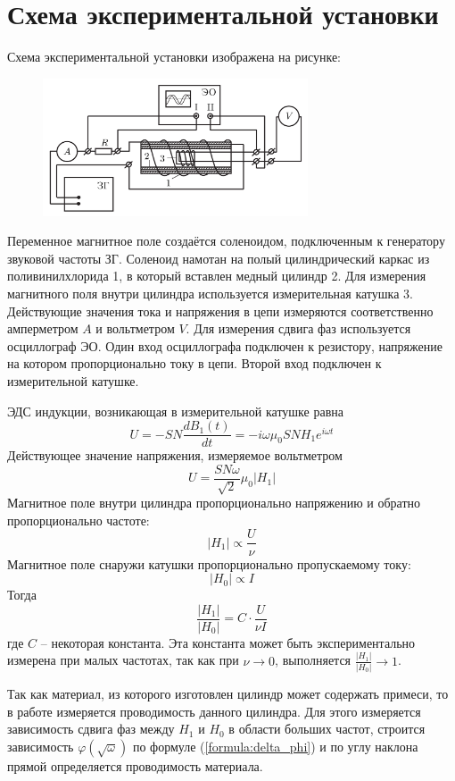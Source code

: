 \section*{Схема экспериментальной установки}

Схема экспериментальной установки изображена на рисунке:

\begin{figure}[H]
	\centering
	\includegraphics[width=0.7\textwidth]{../res/exp scheme.png}
\end{figure}

Переменное магнитное поле создаётся соленоидом, подключенным к генератору звуковой частоты ЗГ. Соленоид намотан на полый цилиндрический каркас из поливинилхлорида 1, в который вставлен медный цилиндр 2. Для измерения магнитного поля внутри цилиндра используется измерительная катушка 3. Действующие значения тока и напряжения в цепи измеряются соответственно амперметром $A$ и вольтметром $V$. Для измерения сдвига фаз используется осциллограф ЭО. Один вход осциллографа подключен к резистору, напряжение на котором пропорционально току в цепи. Второй вход подключен к измерительной катушке.

ЭДС индукции, возникающая в измерительной катушке равна
$$
U = - SN \frac{dB_1(t)}{dt} = -i \omega \mu_0 SN H_1 e^{i\omega t}
$$
Действующее значение напряжения, измеряемое вольтметром
$$
U = \frac{SN \omega}{\sqrt{2}} \mu_0 |H_1|
$$
Магнитное поле внутри цилиндра пропорционально напряжению и обратно пропорционально частоте:
$$
|H_1| \propto \frac{U}{\nu}
$$
Магнитное поле снаружи катушки пропорционально пропускаемому току:
$$
|H_0| \propto I
$$
Тогда 
$$
\frac{|H_1|}{|H_0|} = C \cdot \frac{U}{\nu I}
$$
где $C$ -- некоторая константа. Эта константа может быть экспериментально измерена при малых частотах, так как при $\nu \rightarrow 0$, выполняется $\frac{|H_1|}{|H_0|} \rightarrow 1$.

Так как материал, из которого изготовлен цилиндр может содержать примеси, то в работе измеряется проводимость данного цилиндра. Для этого измеряется зависимость сдвига фаз между $H_1$ и $H_0$ в области больших частот, строится зависимость $\varphi(\sqrt{\omega})$ по формуле (\ref{formula:delta_phi}) и по углу наклона прямой определяется проводимость материала.